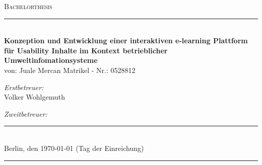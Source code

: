 \newcommand{\HRule}{\rule{\linewidth}{0.0mm}}
\thispagestyle{empty}
\begin{titlepage}
\begin{center}


\textsc{\LARGE Bachelorthesis}\\[0.5cm]
%
%

\HRule \\[1.5 cm]
{ \LARGE \bfseries Konzeption und Entwicklung einer \linebreak interaktiven e-learning
Plattform \linebreak für Usability Inhalte im Kontext \linebreak betrieblicher
Umweltinfomationsysteme}\\[3.2 cm]%



{von: Juale Mercan \linebreak \small Matrikel - Nr.: 0528812}\\[1.0cm]

\begin{minipage}{0.4\textwidth}
\begin{flushleft} \normalsize
\emph{Erstbetreuer:}\\ Volker Wohlgemuth
\end{flushleft}
\end{minipage}
\begin{minipage}{0.4\textwidth}
\begin{flushright} \normalsize
\emph{Zweitbetreuer:} \\  

\end{flushright}
\end{minipage}

\HRule \\[0.3cm]
{\normalsize Berlin, den \today}\linebreak
{\small (Tag der Einreichung)}
\HRule \\[0.3cm]
\begin{minipage}{0.2\textwidth}


\end{minipage}
\end{center}
\end{titlepage}
